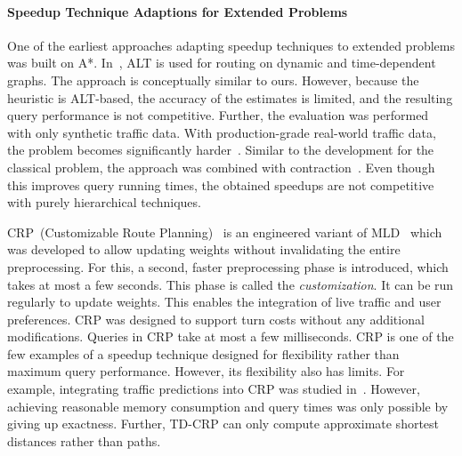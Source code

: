 \documentclass[manuscript,review]{acmart}
\begin{document}
\paragraph{Speedup Technique Adaptions for Extended Problems}
One of the earliest approaches adapting speedup techniques to extended problems was built on A*.
In~\cite{dw-lbrdg-07}, ALT is used for routing on dynamic and time-dependent graphs.
The approach is conceptually similar to ours.
However, because the heuristic is ALT-based, the accuracy of the estimates is limited, and the resulting query performance is not competitive.
Further, the evaluation was performed with only synthetic traffic data.
With production-grade real-world traffic data, the problem becomes significantly harder~\cite{swz-sfert-21}.
Similar to the development for the classical problem, the approach was combined with contraction~\cite{ndls-bastd-12,dn-crdtd-12}.
Even though this improves query running times, the obtained speedups are not competitive with purely hierarchical techniques.

CRP~(Customizable Route Planning)~\cite{dgpw-crprn-13} is an engineered variant of MLD~\cite{swz-umlgt-02} which was developed to allow updating weights without invalidating the entire preprocessing.
For this, a second, faster preprocessing phase is introduced, which takes at most a few seconds.
This phase is called the \emph{customization}.
It can be run regularly to update weights.
This enables the integration of live traffic and user preferences.
CRP was designed to support turn costs without any additional modifications.
Queries in CRP take at most a few milliseconds.
CRP is one of the few examples of a speedup technique designed for flexibility rather than maximum query performance.
However, its flexibility also has limits.
For example, integrating traffic predictions into CRP was studied in~\cite{bdpw-dtdrp-16}.
However, achieving reasonable memory consumption and query times was only possible by giving up exactness.
Further, TD-CRP can only compute approximate shortest distances rather than paths.
\end{document}
